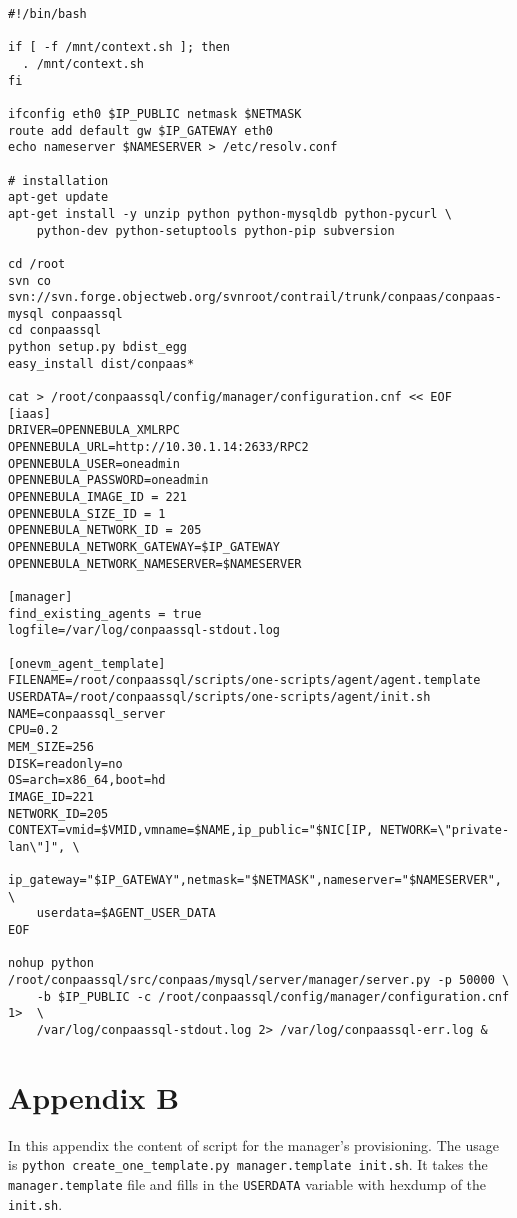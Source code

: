 \documentclass[a4paper,10pt]{article}
\begin{document}
\begin{Verbatim}[frame=single]
#!/bin/bash
 
if [ -f /mnt/context.sh ]; then
  . /mnt/context.sh
fi

ifconfig eth0 $IP_PUBLIC netmask $NETMASK
route add default gw $IP_GATEWAY eth0
echo nameserver $NAMESERVER > /etc/resolv.conf

# installation
apt-get update
apt-get install -y unzip python python-mysqldb python-pycurl \
	python-dev python-setuptools python-pip subversion

cd /root
svn co svn://svn.forge.objectweb.org/svnroot/contrail/trunk/conpaas/conpaas-mysql conpaassql
cd conpaassql
python setup.py bdist_egg
easy_install dist/conpaas*

cat > /root/conpaassql/config/manager/configuration.cnf << EOF
[iaas]
DRIVER=OPENNEBULA_XMLRPC
OPENNEBULA_URL=http://10.30.1.14:2633/RPC2
OPENNEBULA_USER=oneadmin
OPENNEBULA_PASSWORD=oneadmin
OPENNEBULA_IMAGE_ID = 221
OPENNEBULA_SIZE_ID = 1
OPENNEBULA_NETWORK_ID = 205
OPENNEBULA_NETWORK_GATEWAY=$IP_GATEWAY
OPENNEBULA_NETWORK_NAMESERVER=$NAMESERVER

[manager]
find_existing_agents = true
logfile=/var/log/conpaassql-stdout.log

[onevm_agent_template]
FILENAME=/root/conpaassql/scripts/one-scripts/agent/agent.template
USERDATA=/root/conpaassql/scripts/one-scripts/agent/init.sh
NAME=conpaassql_server
CPU=0.2
MEM_SIZE=256
DISK=readonly=no
OS=arch=x86_64,boot=hd
IMAGE_ID=221
NETWORK_ID=205
CONTEXT=vmid=$VMID,vmname=$NAME,ip_public="$NIC[IP, NETWORK=\"private-lan\"]", \
	ip_gateway="$IP_GATEWAY",netmask="$NETMASK",nameserver="$NAMESERVER", \
	userdata=$AGENT_USER_DATA
EOF

nohup python /root/conpaassql/src/conpaas/mysql/server/manager/server.py -p 50000 \
	-b $IP_PUBLIC -c /root/conpaassql/config/manager/configuration.cnf 1>  \
	/var/log/conpaassql-stdout.log 2> /var/log/conpaassql-err.log &

\end{Verbatim}

\newpage

\section{Appendix B}
\label{app:script}

In this appendix the content of script for the manager's provisioning. The usage is {\tt python create\_one\_template.py manager.template init.sh}. It takes the {\tt manager.template} file and fills in the {\tt USERDATA} variable with hexdump of the {\tt init.sh}.
\end{document}
